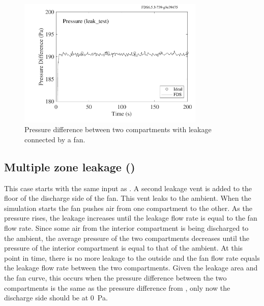 \documentclass[11pt]{book}
\begin{document}
\begin{figure}[ht]
\centering
\includegraphics[width=3.5in]{SCRIPT_FIGURES/leak_test}
\caption[The  case]{Pressure difference between two compartments with leakage connected by a fan.}
\label{leak_test_fig}
\end{figure}

\subsection{Multiple zone leakage (\texorpdfstring{}{leak\_test\_2})}
\label{leak_test_2}

This case starts with the same input as .  A second leakage vent is added to the floor of the discharge side of the fan.  This vent leaks to the ambient.  When the simulation starts the fan pushes air from one compartment to the other. As the pressure rises, the leakage increases until the leakage flow rate is equal to the fan flow rate. Since some air from the interior compartment is being discharged to the ambient, the average pressure of the two compartments decreases until the pressure of the interior compartment is equal to that of the ambient. At this point in time, there is no more leakage to the outside and the fan flow rate equals the leakage flow rate between the two compartments.  Given the leakage area and the fan curve, this occurs when the pressure difference between the two compartments is the same as the pressure difference from , only now the discharge side should be at 0~Pa.
\end{document}
